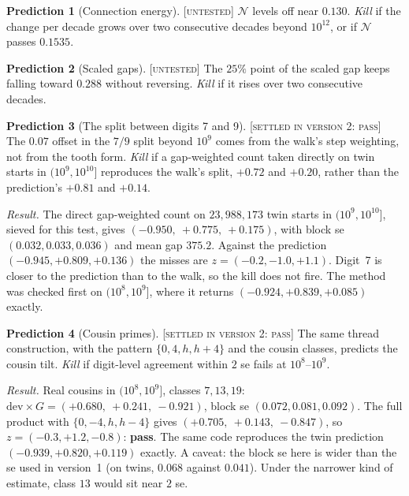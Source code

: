 \documentclass[11pt]{article}
\theoremstyle{definition}
\newtheorem{prediction}{Prediction}
\theoremstyle{remark}
\newcommand{\grade}[1]{\textsc{[#1]}}
\begin{document}
\begin{prediction}[Connection energy] \grade{untested}
$\mathcal N$ levels off near $0.130$.
\emph{Kill} if the change per decade grows over two consecutive decades beyond $10^{12}$, or if $\mathcal N$ passes $0.1535$.
\end{prediction}

\begin{prediction}[Scaled gaps] \grade{untested}
The $25\%$ point of the scaled gap keeps falling toward $0.288$ without reversing.
\emph{Kill} if it rises over two consecutive decades.
\end{prediction}

\begin{prediction}[The split between digits 7 and 9]\label{pr:split} \grade{settled in version 2: pass}
The $0.07$ offset in the $7/9$ split beyond $10^9$ comes from the walk's step weighting, not from the tooth form.
\emph{Kill} if a gap-weighted count taken directly on twin starts in $(10^9,10^{10}]$ reproduces the walk's split, $+0.72$ and $+0.20$, rather than the prediction's $+0.81$ and $+0.14$.

\emph{Result.} The direct gap-weighted count on $23{,}988{,}173$ twin starts in $(10^9,10^{10}]$, sieved for this test, gives $(-0.950,\ +0.775,\ +0.175)$, with block se $(0.032,0.033,0.036)$ and mean gap $375.2$. Against the prediction $(-0.945,+0.809,+0.136)$ the misses are $z=(-0.2,-1.0,+1.1)$. Digit~7 is closer to the prediction than to the walk, so the kill does not fire. The method was checked first on $(10^8,10^9]$, where it returns $(-0.924,+0.839,+0.085)$ exactly.
\end{prediction}

\begin{prediction}[Cousin primes] \grade{settled in version 2: pass}
The same thread construction, with the pattern $\{0,4,h,h+4\}$ and the cousin classes, predicts the cousin tilt.
\emph{Kill} if digit-level agreement within $2$ se fails at $10^8$--$10^9$.

\emph{Result.} Real cousins in $(10^8,10^9]$, classes $7,13,19$: $\mathrm{dev}\times G=(+0.680,\ +0.241,\ -0.921)$, block se $(0.072,0.081,0.092)$. The full product with $\{0,-4,h,h-4\}$ gives $(+0.705,\ +0.143,\ -0.847)$, so $z=(-0.3,+1.2,-0.8)$: \textbf{pass}. The same code reproduces the twin prediction $(-0.939,+0.820,+0.119)$ exactly. A caveat: the block se here is wider than the se used in version~1 (on twins, $0.068$ against $0.041$). Under the narrower kind of estimate, class $13$ would sit near $2$ se.
\end{prediction}
\end{document}
